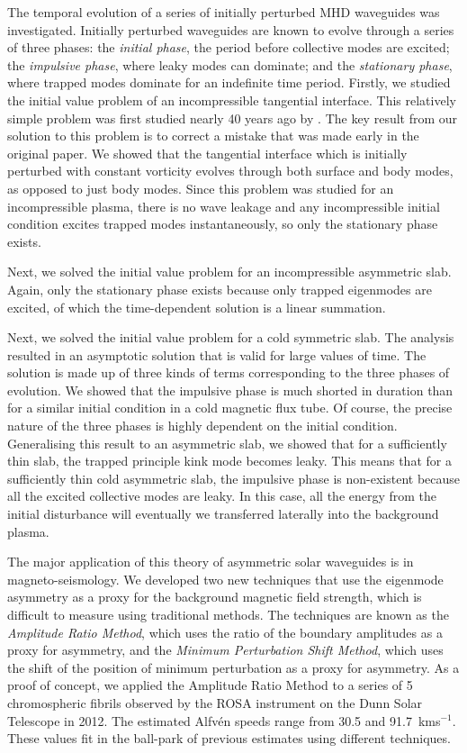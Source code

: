 \documentclass[12pt]{../style-files/ociamthesis}
\begin{document}
The temporal evolution of a series of initially perturbed MHD waveguides was investigated. Initially perturbed waveguides are known to evolve through a series of three phases: the \textit{initial phase}, the period before collective modes are excited; the \textit{impulsive phase}, where leaky modes can dominate; and the \textit{stationary phase}, where trapped modes dominate for an indefinite time period. Firstly, we studied the initial value problem of an incompressible tangential interface. This relatively simple problem was first studied nearly 40 years ago by \cite{rae_etal81}. The key result from our solution to this problem is to correct a mistake that was made early in the original paper. We showed that the tangential interface which is initially perturbed with constant vorticity evolves through both surface and body modes, as opposed to just body modes. Since this problem was studied for an incompressible plasma, there is no wave leakage and any incompressible initial condition excites trapped modes instantaneously, so only the stationary phase exists.

Next, we solved the initial value problem for an incompressible asymmetric slab. Again, only the stationary phase exists because only trapped eigenmodes are excited, of which the time-dependent solution is a linear summation.

Next, we solved the initial value problem for a cold symmetric slab. The analysis resulted in an asymptotic solution that is valid for large values of time. The solution is made up of three kinds of terms corresponding to the three phases of evolution. We showed that the impulsive phase is much shorted in duration than for a similar initial condition in a cold magnetic flux tube. Of course, the precise nature of the three phases is highly dependent on the initial condition. Generalising this result to an asymmetric slab, we showed that for a sufficiently thin slab, the trapped principle kink mode becomes leaky. This means that for a sufficiently thin cold asymmetric slab, the impulsive phase is non-existent because all the excited collective modes are leaky. In this case, all the energy from the initial disturbance will eventually we transferred laterally into the background plasma.

The major application of this theory of asymmetric solar waveguides is in magneto-seismology. We developed two new techniques that use the eigenmode asymmetry as a proxy for the background magnetic field strength, which is difficult to measure using traditional methods. The techniques are known as the \textit{Amplitude Ratio Method}, which uses the ratio of the boundary amplitudes as a proxy for asymmetry, and the \textit{Minimum Perturbation Shift Method}, which uses the shift of the position of minimum perturbation as a proxy for asymmetry. As a proof of concept, we applied the Amplitude Ratio Method to a series of 5 chromospheric fibrils observed by the ROSA instrument on the Dunn Solar Telescope in 2012. The estimated Alfv\'{e}n speeds range from 30.5 and 91.7~kms$^{-1}$. These values fit in the ball-park of previous estimates using different techniques.



 
\end{document}
